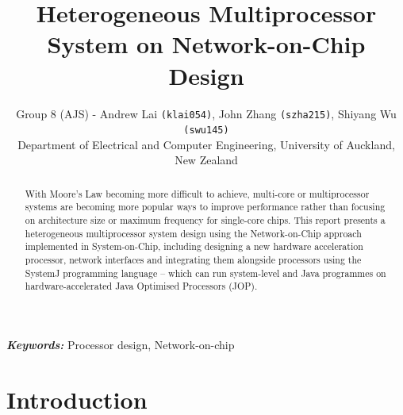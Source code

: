 \documentclass[]{article}
\providecommand{\keywords}[1]{\textbf{\textit{Keywords:}} #1}
\begin{document}
	
	\begin{titlepage}
		
	\end{titlepage}
	\tableofcontents
	\setcounter{page}{1}
	
	\title{\huge \textbf{Heterogeneous Multiprocessor System on Network-on-Chip Design}}
	\author{Group 8 (AJS) - Andrew Lai \texttt{(klai054)}, John Zhang \texttt{(szha215)}, Shiyang Wu \texttt{(swu145)} \\Department of Electrical and Computer Engineering, University of Auckland, New Zealand}
	
	\maketitle
	
	\begin{abstract}
		With Moore’s Law becoming more difficult to achieve, multi-core or multiprocessor systems are becoming more popular ways to improve performance rather than focusing on architecture size or maximum frequency for single-core chips. This report presents a heterogeneous multiprocessor system design using the Network-on-Chip approach implemented in System-on-Chip, including designing a new hardware acceleration processor, network interfaces and integrating them alongside processors using the SystemJ programming language -- which can run system-level and Java programmes on hardware-accelerated Java Optimised Processors (JOP).
	\end{abstract}
	
	
	\keywords{Processor design, Network-on-chip}
	
	\section{Introduction}
	
\end{document}
